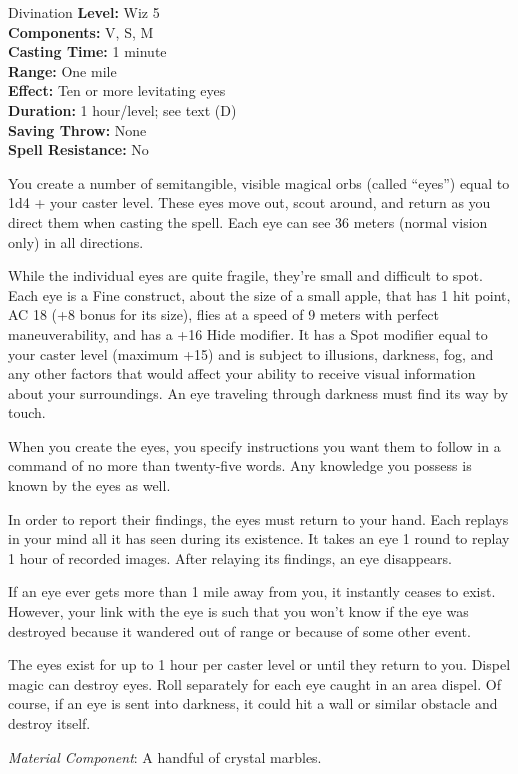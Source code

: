 {Divination}
{
	\textbf{Level:}
	Wiz 5\\
	\textbf{Components:}
	V, S, M\\
	\textbf{Casting Time:}
	1 minute\\
	\textbf{Range:}
	One mile\\
	\textbf{Effect:}
	Ten or more levitating eyes\\
	\textbf{Duration:}
	1 hour/level; see text (D)\\
	\textbf{Saving Throw:}
	None\\
	\textbf{Spell Resistance:}
	No\\
}
{
	You create a number of semitangible, visible magical orbs (called ``eyes'') equal to 1d4 + your caster level. These eyes move out, scout around, and return as you direct them when casting the spell. Each eye can see 36 meters (normal vision only) in all directions.

	While the individual eyes are quite fragile, they're small and difficult to spot. Each eye is a Fine construct, about the size of a small apple, that has 1 hit point, AC 18 (+8 bonus for its size), flies at a speed of 9 meters with perfect maneuverability, and has a +16 Hide modifier. It has a Spot modifier equal to your caster level (maximum +15) and is subject to illusions, darkness, fog, and any other factors that would affect your ability to receive visual information about your surroundings. An eye traveling through darkness must find its way by touch.

	When you create the eyes, you specify instructions you want them to follow in a command of no more than twenty-five words. Any knowledge you possess is known by the eyes as well.

	In order to report their findings, the eyes must return to your hand. Each replays in your mind all it has seen during its existence. It takes an eye 1 round to replay 1 hour of recorded images. After relaying its findings, an eye disappears.

	If an eye ever gets more than 1 mile away from you, it instantly ceases to exist. However, your link with the eye is such that you won't know if the eye was destroyed because it wandered out of range or because of some other event.

	The eyes exist for up to 1 hour per caster level or until they return to you. Dispel magic can destroy eyes. Roll separately for each eye caught in an area dispel. Of course, if an eye is sent into darkness, it could hit a wall or similar obstacle and destroy itself.

	\textit{Material Component}:
	A handful of crystal marbles.

}
